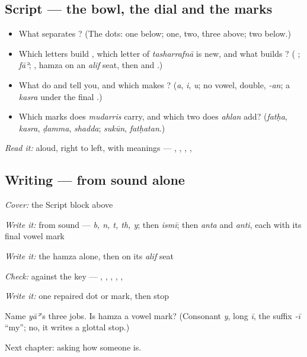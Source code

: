 \subsection*{Script — the bowl, the dial and the marks}
\begin{itemize}
\raggedright
  \item What separates \textbf{    }? (The dots: one below; one, two, three above; two below.)
  \item Which letters build \textbf{}, which letter of \emph{tasharrafnā} is new, and what builds \textbf{}? (\textbf{ }; \emph{fāʾ}; \textbf{}, hamza on an \emph{alif} seat, then \textbf{} and \textbf{}.)
  \item What do \textbf{  } and \textbf{  } tell you, and which makes \textbf{}? (\emph{a}, \emph{i}, \emph{u}; no vowel, double, \emph{-an}; a \emph{kasra} under the final \textbf{}.)
  \item Which marks does \emph{mudarris} carry, and which two does \emph{ahlan} add? (\emph{fatḥa}, \emph{kasra}, \emph{ḍamma}, \emph{shadda}; \emph{sukūn}, \emph{fatḥatan}.)
\end{itemize}

\emph{Read it:} aloud, right to left, with meanings — \textbf{}, \textbf{}, \textbf{}, \textbf{}, \textbf{}

\subsection*{Writing — from sound alone}
\emph{Cover:} the Script block above

\emph{Write it:} from sound — \emph{b, n, t, th, y}; then \emph{ismī}; then \emph{anta} and \emph{anti}, each with its final vowel mark

\emph{Write it:} the hamza alone, then on its \emph{alif} seat

\emph{Check:} against the key — \textbf{    }, \textbf{}, \textbf{}, \textbf{}, \textbf{}, \textbf{}

\emph{Write it:} one repaired dot or mark, then stop

\begin{tcolorbox}[breakable,colback=teal!4,colframe=teal!35!black,title={Before you move on}]
Name \emph{yāʾ}'s three jobs. Is hamza a vowel mark? (Consonant \emph{y}, long \emph{ī}, the suffix \emph{-ī} \textquotedblleft{}my\textquotedblright{}; no, it writes a glottal stop.)

Next chapter: asking how someone is.
\end{tcolorbox}
